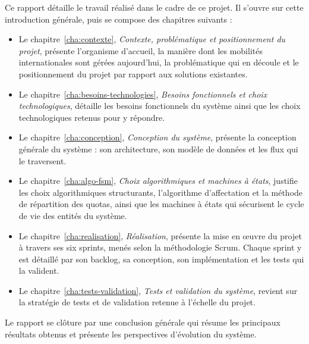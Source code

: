 Ce rapport détaille le travail réalisé dans le cadre de ce projet. Il s'ouvre sur cette introduction générale, puis se compose des chapitres suivants :
\begin{itemize}[label=•]
    \item Le chapitre~\ref{cha:contexte}, \textit{Contexte, problématique et positionnement du projet}, présente l'organisme d'accueil, la manière dont les mobilités internationales sont gérées aujourd'hui, la problématique qui en découle et le positionnement du projet par rapport aux solutions existantes.
    \item Le chapitre~\ref{cha:besoins-technologies}, \textit{Besoins fonctionnels et choix technologiques}, détaille les besoins fonctionnels du système ainsi que les choix technologiques retenus pour y répondre.
    \item Le chapitre~\ref{cha:conception}, \textit{Conception du système}, présente la conception générale du système : son architecture, son modèle de données et les flux qui le traversent.
    \item Le chapitre~\ref{cha:algo-fsm}, \textit{Choix algorithmiques et machines à états}, justifie les choix algorithmiques structurants, l'algorithme d'affectation et la méthode de répartition des quotas, ainsi que les machines à états qui sécurisent le cycle de vie des entités du système.
    \item Le chapitre~\ref{cha:realisation}, \textit{Réalisation}, présente la mise en œuvre du projet à travers ses six sprints, menés selon la méthodologie Scrum. Chaque sprint y est détaillé par son backlog, sa conception, son implémentation et les tests qui la valident.
    \item Le chapitre~\ref{cha:tests-validation}, \textit{Tests et validation du système}, revient sur la stratégie de tests et de validation retenue à l'échelle du projet.
\end{itemize}

Le rapport se clôture par une conclusion générale qui résume les principaux résultats obtenus et présente les perspectives d'évolution du système.
